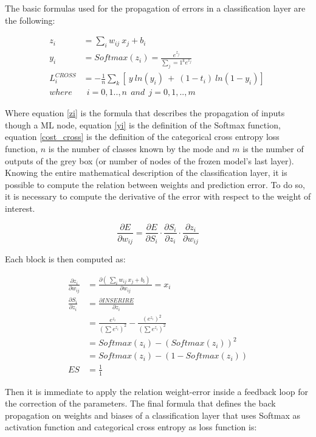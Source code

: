\documentclass[12pt]{report}
\begin{document}
The basic formulas used for the propagation of errors in a classification layer are the following:

\begin{align} 
	z_i &= \sum_i w_{ij} \: x_j + b_i \label{zi} \\ 
	y_i &= Softmax(z_i) = \frac{e^{z_j}}{\sum_j=1^k e^{z_j}} 	\label{yi} \\
	L^{CROSS}_i &= - \frac{1}{n} \sum_k [\ y \: ln(y_i) \: +\: (1-t_i) \: ln(1-y_i) ]\ \label{cost_cross} \\
	where & \: \: i= 0,1..,n  \: \: and \: \:  j=0,1,..,m \nonumber 
\end{align}

Where equation \ref{zi} is the formula that describes the propagation of inputs though a ML node, equation \ref{yi} is the definition of the Softmax function, equation \ref{cost_cross} is the definition of the categorical cross entropy loss function, $n$ is the number of classes known by the mode and $m$ is the number of outputs of the grey box (or number of nodes of the frozen model's last layer).\\
Knowing the entire mathematical description of the classification layer, it is possible to compute the relation between weights and prediction error. To do so, it is necessary to compute the derivative of the error with respect to the weight of interest. 

\begin{equation}
	\frac{\partial E}{\partial w_{ij}} = \frac{\partial E}{\partial S_i} \cdot \frac{\partial S_i}{\partial z_i} \cdot \frac{\partial z_i}{\partial w_{ij}}  
\end{equation}

Each block is then computed as:

\begin{align}
	\frac{\partial z_i}{\partial w_{ij}} &= \frac{ \partial (\ \sum_i w_{ij} \: x_j + b_i )\ }{ \partial w_{ij}} = x_i \\[10pt]
	\frac{\partial S_i}{\partial z_i} &= \frac{\partial INSERIRE}{\partial z_i} \nonumber \\
	&= \frac{e^{z_i}}{(\sum e^{z_i})^2}- \frac{(e^{z_i})^2}{(\sum e^{z_i})^2} \nonumber \\
	&= Softmax(z_i) - (Softmax(z_i))^2 \nonumber \\
	&= Softmax(z_i) - (1-Softmax(z_i)) \\[10pt]
	ES &= \frac{1}{1} 
\end{align}

Then it is immediate to apply the relation weight-error inside a feedback loop for the correction of the parameters. The final formula that defines the back propagation on weights and biases of a classification layer that uses Softmax as activation function and categorical cross entropy as loss function is:
\end{document}
